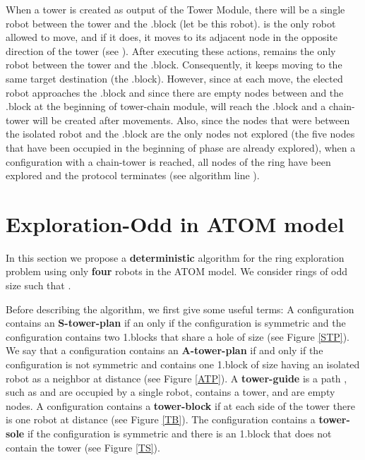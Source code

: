 \documentclass[12pt]{llncs}
\begin{document}
When a tower is created as output of the Tower Module, there will be a single robot between the tower and the .block (let  be this robot).  is the only robot allowed to move, and if it does, it moves to its adjacent node in the opposite direction of the tower (see ). After executing these actions,  remains the only robot between the tower and the .block. Consequently, it keeps moving to the same target destination (the .block). However, since at each move, the elected robot approaches the .block and since there are  empty nodes between  and the .block at the beginning of tower-chain module,  will reach the .block and a chain-tower will be created after  movements. Also, since the  nodes that were between the isolated robot and the .block are the only nodes not explored (the five nodes that have been occupied in the beginning of phase  are already explored), when a configuration with a chain-tower is reached, all nodes of the ring have been explored and the protocol terminates (see algorithm  line ).  


\newpage

\appendix

\section{Exploration-Odd in ATOM model}\label{sec:ExpOdd}

In this section we propose a \textbf{deterministic} algorithm for the ring exploration problem using only \textbf{four} robots in the ATOM model. We consider rings of 
odd size  such that  . 
 	
Before describing the algorithm, we first give some useful terms:
A configuration contains an {\bf S-tower-plan} if an only if the configuration is symmetric and the configuration contains two 1.blocks that share a hole of size  (see Figure \ref{STP}). We say that a configuration contains an {\bf A-tower-plan} if and only if the configuration is not symmetric and contains one 1.block of size  having an isolated robot as a neighbor at distance  (see Figure \ref{ATP}). A {\bf tower-guide} is a path , such as  and  are occupied by a single robot,  contains a tower,  and  are empty nodes. A configuration contains a {\bf tower-block} if at each side of the tower there is one robot at distance  (see Figure \ref{TB}). The configuration contains a {\bf tower-sole} if the configuration is symmetric and there is an 1.block that does not contain the tower (see Figure \ref{TS}).  
\end{document}
